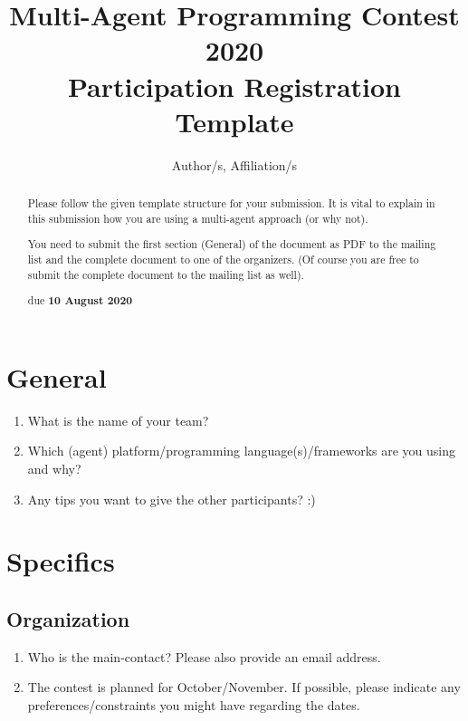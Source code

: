 \documentclass{article}
\begin{document}
\title{Multi-Agent Programming Contest 2020\\Participation Registration Template}
\author{Author/s, Affiliation/s}
\maketitle

\begin{abstract}
  Please follow the given template structure for your submission. It is vital to explain in this submission how you are using a multi-agent approach (or why not).

  You need to submit the first section (General) of the document as PDF to the mailing list and the complete document to one of the organizers. (Of course you are free to submit the complete document to the mailing list as well).

  \begin{center}
    due \textbf{10 August 2020}
  \end{center}
\end{abstract}


\section*{General}

\begin{enumerate}
  \item What is the name of your team?
  \item Which (agent) platform/programming language(s)/frameworks are you using and why?
  \item Any tips you want to give the other participants? :)
\end{enumerate}

\section*{Specifics}

\subsection*{Organization}

\begin{enumerate}
  \item Who is the main-contact? Please also provide an email address.
  \item The contest is planned for October/November. If possible, please indicate any preferences/constraints you might have regarding the dates.
\end{enumerate}
\end{document}
